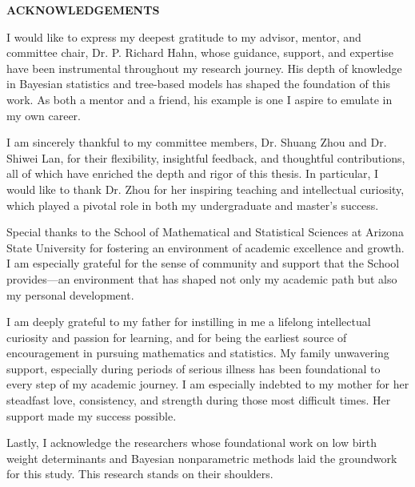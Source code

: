 \begin{center}
    {\large \textbf{ACKNOWLEDGEMENTS}}
\end{center}

I would like to express my deepest gratitude to my advisor, mentor, and committee chair, Dr. P. Richard Hahn, whose guidance, support, and expertise have been instrumental throughout my research journey. His depth of knowledge in Bayesian statistics and tree-based models has shaped the foundation of this work. As both a mentor and a friend, his example is one I aspire to emulate in my own career.

I am sincerely thankful to my committee members, Dr. Shuang Zhou and Dr. Shiwei Lan, for their flexibility, insightful feedback, and thoughtful contributions, all of which have enriched the depth and rigor of this thesis. In particular, I would like to thank Dr. Zhou for her inspiring teaching and intellectual curiosity, which played a pivotal role in both my undergraduate and master's success. 

Special thanks to the School of Mathematical and Statistical Sciences at Arizona State University for fostering an environment of academic excellence and growth. I am especially grateful for the sense of community and support that the School provides—an environment that has shaped not only my academic path but also my personal development.

I am deeply grateful to my father for instilling in me a lifelong intellectual curiosity and passion for learning, and for being the earliest source of encouragement in pursuing mathematics and statistics. My family unwavering support, especially during periods of serious illness has been foundational to every step of my academic journey. I am especially indebted to my mother for her steadfast love, consistency, and strength during those most difficult times. Her support made my success possible. 

Lastly, I acknowledge the researchers whose foundational work on low birth weight determinants and Bayesian nonparametric methods laid the groundwork for this study. This research stands on their shoulders.
\clearpage